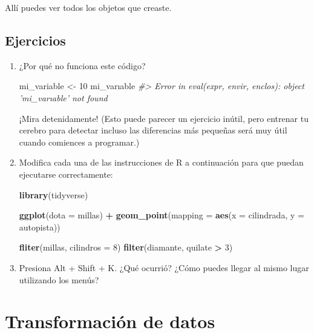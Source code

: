 \documentclass[11pt,oneside]{report}
\newenvironment{Shaded}{\begin{snugshade}}{\end{snugshade}}
\newcommand{\CommentTok}[1]{\textcolor[rgb]{0.56,0.35,0.01}{\textit{#1}}}
\newcommand{\DataTypeTok}[1]{\textcolor[rgb]{0.13,0.29,0.53}{#1}}
\newcommand{\DecValTok}[1]{\textcolor[rgb]{0.00,0.00,0.81}{#1}}
\newcommand{\KeywordTok}[1]{\textcolor[rgb]{0.13,0.29,0.53}{\textbf{#1}}}
\newcommand{\NormalTok}[1]{#1}
\newcommand{\OperatorTok}[1]{\textcolor[rgb]{0.81,0.36,0.00}{\textbf{#1}}}
\newcommand{\StringTok}[1]{\textcolor[rgb]{0.31,0.60,0.02}{#1}}
\begin{document}
Allí puedes ver todos los objetos que creaste.

\hypertarget{ejercicios-7}{%
\section{Ejercicios}\label{ejercicios-7}}

\begin{enumerate}
\def\labelenumi{\arabic{enumi}.}
\item
  ¿Por qué no funciona este código?

\begin{Shaded}
\begin{Highlighting}[]
\NormalTok{mi_variable <-}\StringTok{ }\DecValTok{10}
\NormalTok{mi_varıable}
\CommentTok{#> Error in eval(expr, envir, enclos): object 'mi_varıable' not found}
\end{Highlighting}
\end{Shaded}

  ¡Mira detenidamente! (Esto puede parecer un ejercicio inútil, pero
  entrenar tu cerebro para detectar incluso las diferencias más pequeñas
  será muy útil cuando comiences a programar.)
\item
  Modifica cada una de las instrucciones de R a continuación para que
  puedan ejecutarse correctamente:

\begin{Shaded}
\begin{Highlighting}[]
\KeywordTok{library}\NormalTok{(tidyverse)}

\KeywordTok{ggplot}\NormalTok{(}\DataTypeTok{dota =}\NormalTok{ millas) }\OperatorTok{+}\StringTok{ }
\StringTok{  }\KeywordTok{geom_point}\NormalTok{(}\DataTypeTok{mapping =} \KeywordTok{aes}\NormalTok{(}\DataTypeTok{x =}\NormalTok{ cilindrada, }\DataTypeTok{y =}\NormalTok{ autopista))}

\KeywordTok{fliter}\NormalTok{(millas, }\DataTypeTok{cilindros =} \DecValTok{8}\NormalTok{)}
\KeywordTok{filter}\NormalTok{(diamante, quilate }\OperatorTok{>}\StringTok{ }\DecValTok{3}\NormalTok{)}
\end{Highlighting}
\end{Shaded}
\item
  Presiona Alt + Shift + K. ¿Qué ocurrió? ¿Cómo puedes llegar al mismo
  lugar utilizando los menús?
\end{enumerate}

\hypertarget{transform}{%
\chapter{Transformación de datos}\label{transform}}
\end{document}
